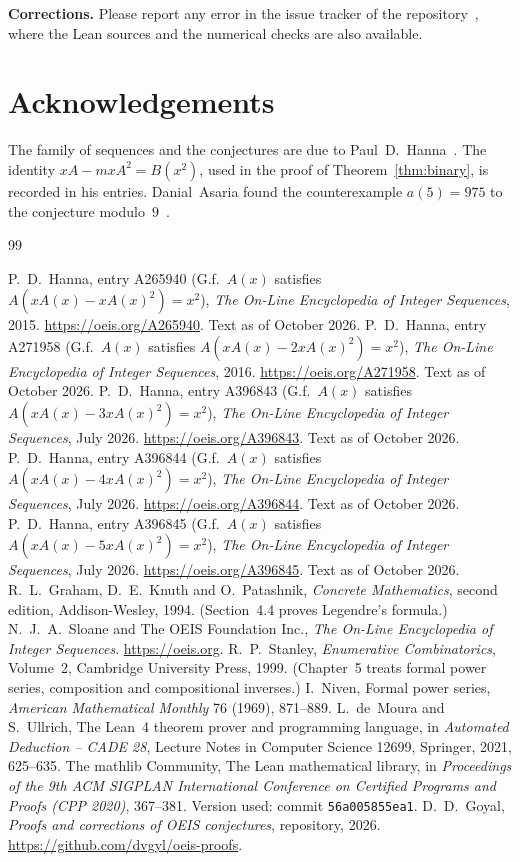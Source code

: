 \documentclass[11pt,a4paper]{article}
\theoremstyle{definition}
\theoremstyle{remark}
\newcommand{\para}[1]{\par\medskip\noindent\textbf{#1}\enspace}
\begin{document}
\para{Corrections.} Please report any error in the issue tracker of the repository~\cite{repo}, where the Lean sources and the numerical checks are also
available.

\section*{Acknowledgements}
The family of sequences and the conjectures are due to Paul~D.~Hanna~\cite{oeis1,oeis2,oeis3,oeis4,oeis5}. The identity
$xA-mxA^2=B(x^2)$, used in the proof of Theorem~\ref{thm:binary}, is recorded in his entries. Danial~Asaria found the counterexample $a(5)=975$ to the conjecture modulo~$9$~\cite{oeis3}.

\begin{thebibliography}{99}\small
\raggedright
{} P.~D.~Hanna, entry A265940 (G.f.\ $A(x)$ satisfies $A(xA(x)-xA(x)^2)=x^2$), \emph{The On-Line Encyclopedia of Integer Sequences}, 2015. \url{https://oeis.org/A265940}. Text as of October 2026.
 P.~D.~Hanna, entry A271958 (G.f.\ $A(x)$ satisfies $A(xA(x)-2xA(x)^2)=x^2$), \emph{The On-Line Encyclopedia of Integer Sequences}, 2016. \url{https://oeis.org/A271958}. Text as of October 2026.
 P.~D.~Hanna, entry A396843 (G.f.\ $A(x)$ satisfies $A(xA(x)-3xA(x)^2)=x^2$), \emph{The On-Line Encyclopedia of Integer Sequences}, July 2026. \url{https://oeis.org/A396843}. Text as of October 2026.
 P.~D.~Hanna, entry A396844 (G.f.\ $A(x)$ satisfies $A(xA(x)-4xA(x)^2)=x^2$), \emph{The On-Line Encyclopedia of Integer Sequences}, July 2026. \url{https://oeis.org/A396844}. Text as of October 2026.
 P.~D.~Hanna, entry A396845 (G.f.\ $A(x)$ satisfies $A(xA(x)-5xA(x)^2)=x^2$), \emph{The On-Line Encyclopedia of Integer Sequences}, July 2026. \url{https://oeis.org/A396845}. Text as of October 2026.
 R.~L.~Graham, D.~E.~Knuth and O.~Patashnik, \emph{Concrete Mathematics}, second edition, Addison-Wesley, 1994. (Section~4.4 proves Legendre's formula.)
 N.~J.~A.~Sloane and The OEIS Foundation Inc., \emph{The On-Line Encyclopedia of Integer Sequences}. \url{https://oeis.org}.
 R.~P.~Stanley, \emph{Enumerative Combinatorics}, Volume~2, Cambridge University Press, 1999. (Chapter~5 treats formal power series, composition and compositional inverses.)
 I.~Niven, Formal power series, \emph{American Mathematical Monthly} 76 (1969), 871--889.
 L.~de~Moura and S.~Ullrich, The Lean~4 theorem prover and programming language, in \emph{Automated Deduction -- CADE 28}, Lecture Notes in Computer Science 12699, Springer, 2021, 625--635.
 The mathlib Community, The Lean mathematical library, in \emph{Proceedings of the 9th ACM SIGPLAN International Conference on Certified Programs and Proofs (CPP 2020)}, 367--381. Version used: commit \texttt{56a005855ea1}.
 D.~D.~Goyal, \emph{Proofs and corrections of OEIS conjectures}, repository, 2026. \url{https://github.com/dvgyl/oeis-proofs}.
\end{thebibliography}
\end{document}
